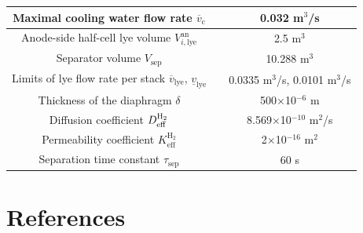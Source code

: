 \documentclass[review,3p,10pt]{elsarticle}
\begin{document}
\begin{table}[h]
\begin{tabular}{ccc}
  Maximal cooling water flow rate $\overline{v}_\text{c}$                       & & 0.032 m$^3$/s        \\ \hline
  Anode-side half-cell lye volume $V^{\text{an}}_{i,\text{lye}}$                & & 2.5 m$^3$    \\
  Separator volume $V_{\text{sep}}$                                             & & 10.288 m$^3$    \\
  Limits of lye flow rate per stack  $\overline{v}_{\text{lye}}$, $\underline{v}_{\text{lye}}$  & & 0.0335 m$^3$/s, 0.0101 m$^3$/s    \\
  Thickness of the diaphragm $\delta$                                           & & 500$\times$10$^{-6}$ m \\
  Diffusion coefficient $D^{\rm{H_2}}_{\rm{eff}}$                               & & 8.569$\times$10$^{-10}$ m$^2$/s    \\
  Permeability coefficient $K^{\text{H}_2}_{\text{eff}}$                        & & 2$\times$10$^{-16}$  m$^2$   \\
  Separation time constant $\tau_\text{sep}$                                    & & $60$ s    \\
  \hline \hline
  \end{tabular}
\end{table}


%





\break
\section*{References}



\end{document}

